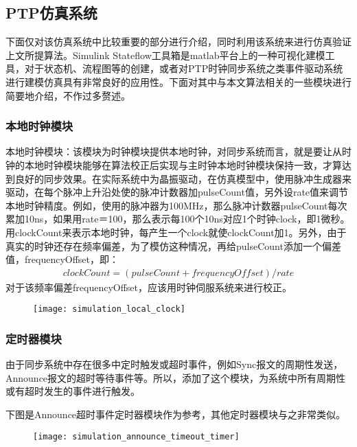 \subsection{PTP仿真系统}
下面仅对该仿真系统中比较重要的部分进行介绍，同时利用该系统来进行仿真验证上文所提算法。Simulink Stateflow工具箱是matlab平台上的一种可视化建模工具，对于状态机、流程图等的创建，或者对PTP时钟同步系统之类事件驱动系统进行建模仿真具有非常良好的应用性。下面对其中与本文算法相关的一些模块进行简要地介绍，不作过多赘述。

\subsubsection{本地时钟模块}
本地时钟模块：该模块为时钟模块提供本地时钟，对同步系统而言，就是要让从时钟的本地时钟模块能够在算法校正后实现与主时钟本地时钟模块保持一致，才算达到良好的同步效果。在实际系统中为晶振驱动，在仿真模型中，使用脉冲生成器来驱动，在每个脉冲上升沿处使的脉冲计数器加pulseCount值，另外设rate值来调节本地时钟精度。例如，使用的脉冲器为100MHz，那么脉冲计数器pulseCount每次累加10ns，如果用rate＝100，那么表示每100个10ns对应1个时钟clock，即1微秒。用clockCount来表示本地时钟，每产生一个clock就使clockCount加1。另外，由于真实的时钟还存在频率偏差，为了模仿这种情况，再给pulseCount添加一个偏差值，frequencyOffset，即：
\begin{align}
  clockCount = (pulseCount + frequencyOffset) / rate
\end{align}
对于该频率偏差frequencyOffset，应该用时钟伺服系统来进行校正。
\begin{figure}[!hbp]
  \centering
  \begin{minipage}[b]{1\textwidth}
    \captionstyle{\centering}
    \centering
    \texttt{[image: simulation\_local\_clock]}
  \end{minipage}     
\end{figure}

\subsubsection{定时器模块}
由于同步系统中存在很多中定时触发或超时事件，例如Sync报文的周期性发送，Announce报文的超时等待事件等。所以，添加了这个模块，为系统中所有周期性或有超时发生的事件进行触发。

下图是Announce超时事件定时器模块作为参考，其他定时器模块与之非常类似。
\begin{figure}[!hbp]
  \centering
  \begin{minipage}[b]{1\textwidth}
    \captionstyle{\centering}
    \centering
    \texttt{[image: simulation\_announce\_timeout\_timer]}
  \end{minipage}     
\end{figure}

